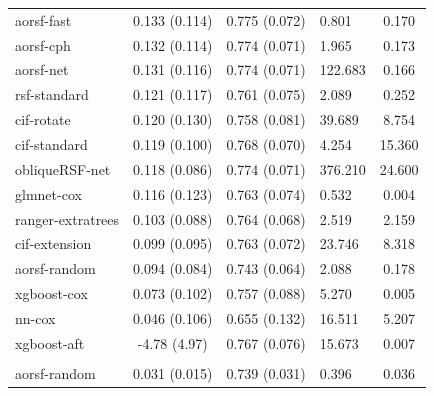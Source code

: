 \documentclass[twoside,11pt]{article}\usepackage[]{graphicx}\usepackage[]{xcolor}
\newenvironment{knitrout}{}{} %
\begin{document}
\begin{knitrout}
\begin{longtable}[t]{lcclc}
\endfoot
\bottomrule
\endlastfoot
\addlinespace[0.3em]
\hline
\multicolumn{5}{l}{\textit{\textbf{Overall}}}\\
\hline
\hspace{1em}aorsf-fast & 0.133 (0.114) & 0.775 (0.072) & 0.801 & 0.170\\
\hspace{1em}aorsf-cph & 0.132 (0.114) & 0.774 (0.071) & 1.965 & 0.173\\
\hspace{1em}aorsf-net & 0.131 (0.116) & 0.774 (0.071) & 122.683 & 0.166\\
\hspace{1em}rsf-standard & 0.121 (0.117) & 0.761 (0.075) & 2.089 & 0.252\\
\hspace{1em}cif-rotate & 0.120 (0.130) & 0.758 (0.081) & 39.689 & 8.754\\
\hspace{1em}cif-standard & 0.119 (0.100) & 0.768 (0.070) & 4.254 & 15.360\\
\hspace{1em}obliqueRSF-net & 0.118 (0.086) & 0.774 (0.071) & 376.210 & 24.600\\
\hspace{1em}glmnet-cox & 0.116 (0.123) & 0.763 (0.074) & 0.532 & 0.004\\
\hspace{1em}ranger-extratrees & 0.103 (0.088) & 0.764 (0.068) & 2.519 & 2.159\\
\hspace{1em}cif-extension & 0.099 (0.095) & 0.763 (0.072) & 23.746 & 8.318\\
\hspace{1em}aorsf-random & 0.094 (0.084) & 0.743 (0.064) & 2.088 & 0.178\\
\hspace{1em}xgboost-cox & 0.073 (0.102) & 0.757 (0.088) & 5.270 & 0.005\\
\hspace{1em}nn-cox & 0.046 (0.106) & 0.655 (0.132) & 16.511 & 5.207\\
\hspace{1em}xgboost-aft & -4.78 (4.97) & 0.767 (0.076) & 15.673 & 0.007\\
\addlinespace[0.3em]
\hline
\multicolumn{5}{l}{\textit{\textbf{ACTG 320; AIDS diagnosis, n = 1151, p = 12}}}\\
\hline
\hspace{1em}aorsf-random & 0.031 (0.015) & 0.739 (0.031) & 0.396 & 0.036\\

\end{longtable}
\end{knitrout}
\end{document}
